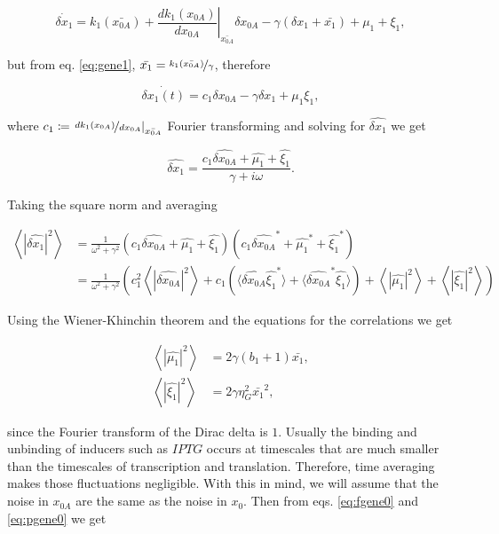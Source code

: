 \begin{equation}
\dot{\delta x_1} = k_1(\bar{x_{0A}}) + \left.\frac{dk_1(x_{0A})}{dx_{0A}}\right|_{\bar{x_{0A}}}\delta x_{0A} - \gamma(\delta x_1 + \bar{x_1}) + \mu_1 + \xi_1,
\end{equation}

but from eq. \eqref{eq:gene1}, $\bar{x_1} = \nicefrac{k_1(\bar{x_{0A}})}{\gamma}$, therefore

\begin{equation}
  \label{eq:dgene1}
  \dot{\delta{x_1}(t)}=c_1\delta x_{0A}-\gamma\delta x_1 + \mu_1 \xi_1,
\end{equation}

where $c_1 \coloneqq \left.\nicefrac{dk_1(x_{0A})}{dx_{0A}}\right|_{\bar{x_{0A}}}$ Fourier transforming and solving for $\hat{\delta x_1}$ we get

\begin{equation*}
  \hat{\delta x_1}=\frac{c_1\hat{\delta x_{0A}}+\hat{\mu_1}+\hat{\xi_1}}{\gamma + i\omega}.
\end{equation*}

Taking the square norm and averaging

\begin{equation*}
  \label{eq:pgene1}
  \begin{split}
    \left\langle|\hat{\delta x_1}|^2\right\rangle &= \frac{1}{\omega^2+\gamma^2}\left(c_1\hat{\delta x_{0A}} + \hat{\mu_1} + \hat{\xi_1}\right)\left(c_1\hat{\delta x_{0A}}^* + \hat{\mu_1}^* + \hat{\xi_1}^*\right)\\
    &=\frac{1}{\omega^2+\gamma^2}\left(c_1^2 \left\langle|\hat{\delta x_{0A}}|^2\right\rangle + c_1\left(\langle\hat{\delta x_{0A}}\hat{\xi_1}^*\rangle+\langle\hat{\delta x_{0A}}^*\hat{\xi_1}\rangle\right) +  \left\langle|\hat{\mu_1}|^2\right\rangle +  \left\langle|\hat{\xi_1}|^2\right\rangle\right)
  \end{split}
\end{equation*}

Using the Wiener-Khinchin theorem and the equations for the correlations we get

\begin{align*}
  \left\langle|\hat{\mu_1}|^2\right\rangle &= 2\gamma(b_1+1)\bar{x_1},\\
  \left\langle|\hat{\xi_1}|^2\right\rangle &= 2\gamma\eta_G^2\bar{x_1}^2,
\end{align*}

since the Fourier transform of the Dirac delta is $1$. Usually the binding and unbinding of inducers such as $IPTG$ occurs at timescales that are much smaller than the timescales of transcription and translation. Therefore, time averaging makes those fluctuations negligible. With this in mind, we will assume that the noise in $x_{0A}$ are the same as the noise in $x_0$. Then from eqs. \eqref{eq:fgene0} and \eqref{eq:pgene0} we get

